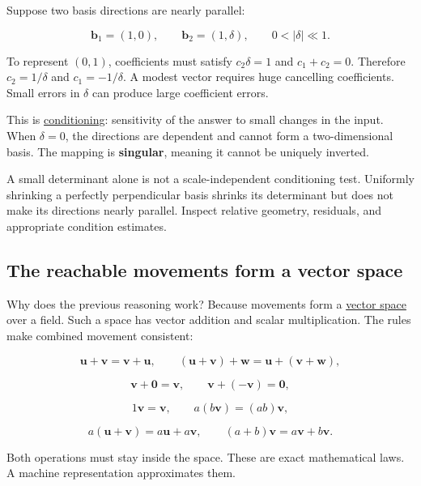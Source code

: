 \hypertarget{01-foundations-i-ch017-why-a-basis-can-become-unreliable}{}

Suppose two basis directions are nearly parallel:

\[
\mathbf b_1=(1,0),\qquad \mathbf b_2=(1,\delta),\qquad 0<|\delta|\ll1.
\]

To represent \((0,1)\), coefficients must satisfy \(c_2\delta=1\) and \(c_1+c_2=0\). Therefore \(c_2=1/\delta\) and \(c_1=-1/\delta\). A modest vector requires huge cancelling coefficients. Small errors in \(\delta\) can produce large coefficient errors.

This is \hyperref[01-foundations-i-ch018-an-inverse-can-exist-and-still-amplify-uncertainty]{conditioning}: sensitivity of the answer to small changes in the input. When \(\delta=0\), the directions are dependent and cannot form a two-dimensional basis. The mapping is \textbf{singular}, meaning it cannot be uniquely inverted.

A small determinant alone is not a scale-independent conditioning test. Uniformly shrinking a perfectly perpendicular basis shrinks its determinant but does not make its directions nearly parallel. Inspect relative geometry, residuals, and appropriate condition estimates.

\subsection{The reachable movements form a vector space}\label{01-foundations-i-ch017-the-reachable-movements-form-a-vector-space}

\hypertarget{01-foundations-i-ch017-the-reachable-movements-form-a-vector-space}{}

Why does the previous reasoning work? Because movements form a \hyperref[01-foundations-i-ch017-the-reachable-movements-form-a-vector-space]{vector space} over a field. Such a space has vector addition and scalar multiplication. The rules make combined movement consistent:

\[
\mathbf u+\mathbf v=\mathbf v+\mathbf u,\qquad
(\mathbf u+\mathbf v)+\mathbf w=\mathbf u+(\mathbf v+\mathbf w),
\]

\[
\mathbf v+\mathbf0=\mathbf v,\qquad
\mathbf v+(-\mathbf v)=\mathbf0,
\]

\[
1\mathbf v=\mathbf v,\qquad
a(b\mathbf v)=(ab)\mathbf v,
\]

\[
a(\mathbf u+\mathbf v)=a\mathbf u+a\mathbf v,\qquad
(a+b)\mathbf v=a\mathbf v+b\mathbf v.
\]

Both operations must stay inside the space. These are exact mathematical laws. A machine representation approximates them.

